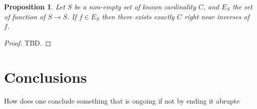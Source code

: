 \documentclass[11pt]{article}
\theoremstyle{plain}
\newtheorem{proposition}[definition]{Proposition}
\theoremstyle{nonumberplain}
\newtheorem{proof}[definition]{Proof}
\begin{document}
\begin{proposition}
    Let $S$ be a non-empty set of known cardinality $C$, and $E_S$ the set of function of $S \to S$. If $f \in E_S$ then there exists exactly $C$ right near inverses of $f$.
\end{proposition}

\begin{proof}
    TBD.
\end{proof}

\section{Conclusions}

How does one conclude something that is ongoing if not by ending it abrupte
\end{document}
